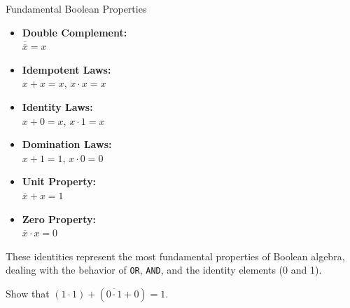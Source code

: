 \begin{custombox}{Fundamental Boolean Properties}
\begin{itemize}
    \item \textbf{Double Complement:} \\
    \hspace*{15pt} $\overline{\overline{x}} = x$\hspace{15pt}
    
    \item \textbf{Idempotent Laws:} \\
    \hspace*{15pt}$x + x = x$, \quad $x \cdot x = x$
    
    \item \textbf{Identity Laws:} \\
    \hspace*{15pt}$x + 0 = x$, \quad $x \cdot 1 = x$
    
    \item \textbf{Domination Laws:} \\
    \hspace*{15pt}$x + 1 = 1$, \quad $x \cdot 0 = 0$
    
    \item \textbf{Unit Property:} \\
    \hspace*{15pt}$\overline{x} + x = 1$
    
    \item \textbf{Zero Property:} \\
    \hspace*{15pt} $\overline{x} \cdot x = 0$
\end{itemize}
\end{custombox}

These identities represent the most fundamental properties of Boolean algebra, dealing with the behavior of \texttt{OR}, \texttt{AND}, and the identity elements (0 and 1).

\begin{example} Show that $(1 \cdot 1)+(\overline{0 \cdot 1}+0)=1$.         
\end{example}


